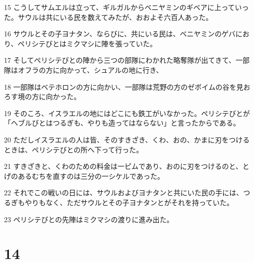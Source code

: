 \par 15 こうしてサムエルは立って、ギルガルからベニヤミンのギベアに上っていった。サウルは共にいる民を数えてみたが、おおよそ六百人あった。
\par 16 サウルとその子ヨナタン、ならびに、共にいる民は、ベニヤミンのゲバにおり、ペリシテびとはミクマシに陣を張っていた。
\par 17 そしてペリシテびとの陣から三つの部隊にわかれた略奪隊が出てきて、一部隊はオフラの方に向かって、シュアルの地に行き、
\par 18 一部隊はベテホロンの方に向かい、一部隊は荒野の方のゼボイムの谷を見おろす境の方に向かった。
\par 19 そのころ、イスラエルの地にはどこにも鉄工がいなかった。ペリシテびとが「ヘブルびとはつるぎも、やりも造ってはならない」と言ったからである。
\par 20 ただしイスラエルの人は皆、そのすきざき、くわ、おの、かまに刃をつけるときは、ペリシテびとの所へ下って行った。
\par 21 すきざきと、くわのための料金は一ピムであり、おのに刃をつけるのと、とげのあるむちを直すのは三分の一シケルであった。
\par 22 それでこの戦いの日には、サウルおよびヨナタンと共にいた民の手には、つるぎもやりもなく、ただサウルとその子ヨナタンとがそれを持っていた。
\par 23 ペリシテびとの先陣はミクマシの渡りに進み出た。

\chapter{14}

